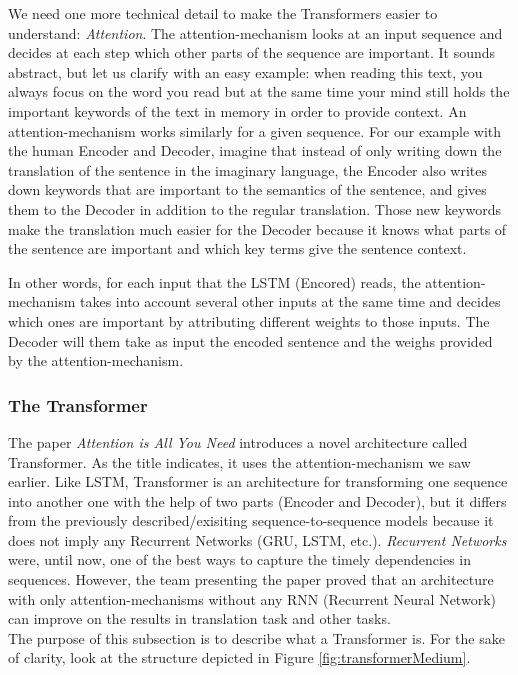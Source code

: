 We need one more technical detail to make the Transformers easier to understand:
\textit{Attention}. The attention-mechanism looks at an input sequence and decides
at each step which other parts of the sequence are important. It sounds abstract,
but let us clarify with an easy example: when reading this text, you always focus
on the word you read but at the same time your mind still holds the important keywords
of the text in memory in order to provide context. An attention-mechanism works
similarly for a given sequence. For our example with the human Encoder and Decoder,
imagine that instead of only writing down the translation of the sentence in the
imaginary language, the Encoder also writes down keywords that are important to the
semantics of the sentence, and gives them to the Decoder in addition to the
regular translation. Those new keywords make the translation much easier for the
Decoder because it knows what parts of the sentence are important and which key terms
give the sentence context.
\newline

In other words, for each input that the LSTM (Encored) reads, the attention-mechanism
takes into account several other inputs at the same time and decides which ones are
important by attributing different weights to those inputs. The Decoder will
them take as input the encoded sentence and the weighs provided by the attention-mechanism.

\subsubsection{The Transformer}
The paper \textit{Attention is All You Need} introduces a novel architecture called
Transformer. As the title indicates, it uses the attention-mechanism we saw earlier.
Like LSTM, Transformer is an architecture for transforming one sequence into another
one with the help of two parts (Encoder and Decoder), but it differs from the
previously described/exisiting sequence-to-sequence models because it does not
imply any Recurrent Networks (GRU, LSTM, etc.). \textit{Recurrent Networks} were,
until now, one of the best ways to capture the timely dependencies in sequences.
However, the team presenting the paper proved that an architecture with only attention-mechanisms
without any RNN (Recurrent Neural Network) can improve on the results in translation
task and other tasks. \\ The purpose of this subsection is to describe what a
Transformer is. For the sake of clarity, look at the structure depicted in
Figure \ref{fig:transformerMedium}.
\newline

